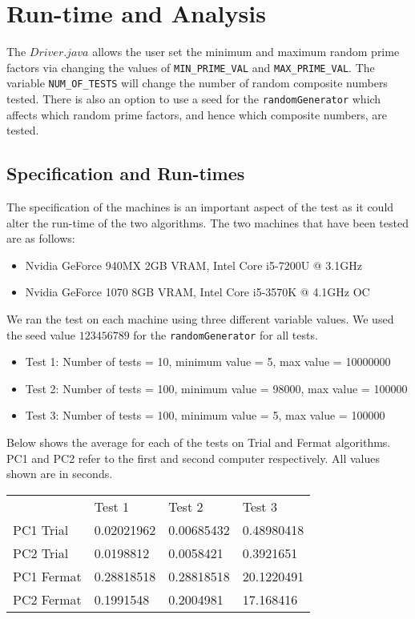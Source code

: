 \documentclass[]{article}
\begin{document}
	\section{Run-time and Analysis}
	The $Driver.java$ allows the user set the minimum and maximum random prime factors via changing the values of \lstinline|MIN_PRIME_VAL| and \lstinline|MAX_PRIME_VAL|. The variable \lstinline|NUM_OF_TESTS| will change the number of random composite numbers tested. There is also an option to use a seed for the \lstinline|randomGenerator| which affects which random prime factors, and hence which composite numbers, are tested.
	
	\subsection{Specification and Run-times}
	The specification of the machines is an important aspect of the test as it could alter the run-time of the two algorithms. The two machines that have been tested are as follows:
	\begin{itemize}
		\item Nvidia GeForce 940MX 2GB VRAM, Intel Core i5-7200U @ 3.1GHz
		\item Nvidia GeForce 1070 8GB VRAM, Intel Core i5-3570K @ 4.1GHz OC
	\end{itemize}
	We ran the test on each machine using three different variable values. We used the seed value $123456789$ for the \lstinline|randomGenerator| for all tests.
	
	\pagebreak
	\begin{itemize}
		\item Test 1: Number of tests = 10, minimum value = 5, max value = 10000000
		\item Test 2: Number of tests = 100, minimum value = 98000, max value = 100000
		\item Test 3: Number of tests = 100, minimum value = 5, max value = 100000
	\end{itemize}
	Below shows the average for each of the tests on Trial and Fermat algorithms. PC1 and PC2 refer to the first and second computer respectively. All values shown are in seconds.
	
	\begin{table}[!h]
		\begin{tabular}{llll}
			& Test 1  & Test 2  & Test 3  \\
			PC1 Trial  & 0.02021962 & 0.00685432 & 0.48980418 \\
			PC2 Trial  & 0.0198812  & 0.0058421  & 0.3921651  \\
			PC1 Fermat & 0.28818518 & 0.28818518 & 20.1220491 \\
			PC2 Fermat & 0.1991548  & 0.2004981  & 17.168416 
		\end{tabular}
	\end{table}
	
\end{document}

